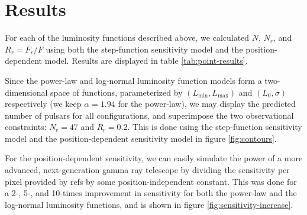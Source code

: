 \documentclass{C://Aliases//Dropbox-MIT//Latex_Templates//personal}
\begin{document}
\section{Results}
For each of the luminosity functions described above, we calculated $N$, $N_r$, and $R_r = F_r / F$ using both the step-function sensitivity model and the position-dependent model. Results are displayed in table \ref{tab:point-results}.

Since the power-law and log-normal luminosity function models form a two-dimensional space of functions, parameterized by $(L_\text{min}, L_\text{max})$ and $(L_0, \sigma)$ respectively (we keep $\alpha =1.94$ for the power-law), we may display the predicted number of pulsars for all configurations, and superimpose the two observational constraints: $N_\text{r} = 47$ and $R_\text{r} = 0.2$. This is done using the step-function sensitivity model and the position-dependent sensitivity model in figure \ref{fig:contours}.

For the position-dependent sensitivity, we can easily simulate the power of a more advanced, next-generation gamma ray telescope by dividing the sensitivity per pixel provided by refs \cite{Fermi-LAT:2019yla, Ballet:2020hze} by some position-independent constant. This was done for a 2-, 5-, and 10-times improvement in sensitivity for both the power-law and the log-normal luminosity functions, and is shown in figure \ref{fig:sensitivity-increase}.
\end{document}
